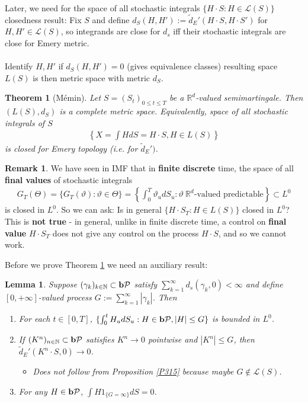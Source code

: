 \documentclass[12pt,a4paper, twoside]{article}
\newtheorem{lem}{Lemma}[section]
\newtheorem{thm}{Theorem}[section]
\theoremstyle{definition}
\newtheorem{rem}{Remark}[section]
\newcommand{\pred}{\textbf{\text{b}}\mathcal{P}}
\begin{document}
Later, we need for the space of all stochastic integrals $\{ H \cdot S : H \in \mathcal{L}(S) \}$ closedness result: Fix $S$ and define $d_S(H,H'):= \widetilde{d}_E'(H \cdot S , H \cdot S')$ for $H,H' \in \mathcal{L}(S)$, so integrands are close for $d_s$ iff their stochastic integrals are close for Emery metric. 
\\\\
Identify $H, H'$ if $d_S(H,H')=0$ (gives equivalence classes) resulting space $L(S)$ is then metric space with metric $d_S$. 
\newpage
\begin{thm}[Mémin] \label{T317} Let $S=(S_t)_{0 \leq t \leq T}$ be a $\mathbb{R}^d$-valued semimartingale. Then $(L(S), d_S)$ is a complete metric space. Equivalently, space of all stochastic integrals of $S$ 
\begin{align*}
\left\{ X= \int H dS = H \cdot S, H \in L(S) \right\}
\end{align*}
is closed for Emery topology (i.e. for $\widetilde{d}_E')$. 
\end{thm}
\begin{rem} We have seen in IMF that in \textbf{finite discrete} time, the space of all \textbf{final values} of stochastic integrals 
\begin{align*}
G_T( \Theta) = \{ G_T( \vartheta) : \vartheta \in \Theta\} = \left\{ \int_0^T \vartheta_u dS_u : \vartheta \ \mathbb{R}^d\text{-valued predictable} \right\} \subset L^0
\end{align*}
is closed in $L^0$. So we can ask: Is in general $\{ H \cdot S_T : H \in L(S) \}$ closed in $L^0$? 
\\
This is \textbf{not true} - in general, unlike in finite discrete time, a control on \textbf{final value} $H \cdot S_T$ does not give any control on the process $H \cdot S$, and so we cannot work. 
\end{rem}
Before we prove Theorem \ref{T317} we need an auxiliary result:
\begin{lem}\label{L316} Suppose $( \gamma_k)_{k \in \mathbb{N}} \subset \pred$ satisfy $\sum_{k=1}^\infty d_s( \gamma_k,0) < \infty$ and define $[0,+ \infty]$-valued process $G:= \sum_{k=1}^\infty | \gamma_k|$. Then 
\begin{enumerate}
\item For each $t \in [0,T]$, $ \{ \int_0^t H_u dS_u : H \in \pred , |H| \leq G \}$ is bounded in $L^0$. 
\item If $(K^n)_{n \in \mathbb{N}} \subset \pred$ satisfies $K^n \to 0$ pointwise and $|K^n| \leq G$, then \\ $\widetilde{d}_E'( K^n \cdot S,0) \to 0$. 
\begin{itemize}
\item Does not follow from Proposition \ref{P315} because maybe $G \notin \mathcal{L}(S)$.
\end{itemize}
\item For any $H \in \pred$, $ \int H 1_{\{ G = \infty\}} dS =0$. 
\end{enumerate}
\end{lem}
\end{document}
